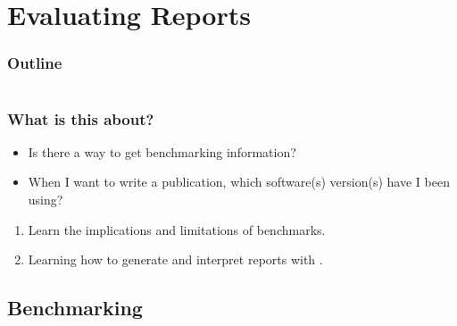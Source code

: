 \section{Evaluating Reports}

\begin{frame}
    \frametitle{Outline}
    \begin{columns}[t]
        \begin{column}{.5\textwidth}
            \tableofcontents[sections={1-7},currentsection]
        \end{column}
        \begin{column}{.5\textwidth}
            \tableofcontents[sections={8-15},currentsection]
        \end{column}
    \end{columns}
\end{frame}

\begin{frame}
  \frametitle{What is this about?}
   \begin{question}[Questions]
   	 \begin{itemize}
        \item Is there a way to get benchmarking information?
        \item When I want to write a publication, which software(s) version(s) have I been using?
     \end{itemize}
   \end{question}
   \begin{docs}[Objectives]
   	  \begin{enumerate}
         \item Learn the implications and limitations of benchmarks.
         \item Learning how to generate and interpret reports with \Snakemake{}.
      \end{enumerate}
  \end{docs}
\end{frame}

\subsection{Benchmarking}

